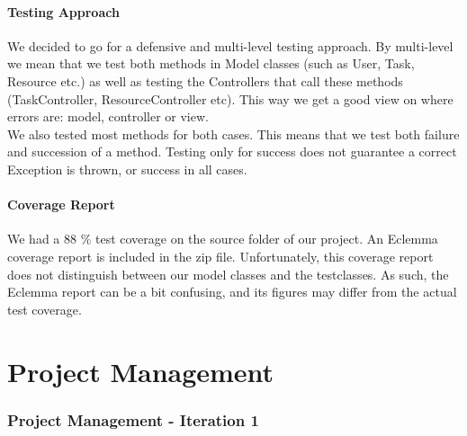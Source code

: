 		\subsection{Testing Approach}
		We decided to go for a defensive and multi-level testing approach.
		By multi-level we mean that we test both methods in Model classes (such as User, Task, Resource etc.) as well as testing the Controllers that call these methods (TaskController, ResourceController etc). 
		This way we get a good view on where errors are: model, controller or view.\\
		We also tested most methods for both cases. This means that we test both failure and succession of a method. Testing only for success does not guarantee a correct Exception is thrown, or success in all cases.
		\subsection{Coverage Report}
		We had a 88 \% test coverage on the source folder of our project. An Eclemma coverage report is included in the zip file. Unfortunately, this coverage report does not distinguish between our model classes and the testclasses. As such, the Eclemma report can be a bit confusing, and its figures may differ from the actual test coverage.
	
	\part{Project Management}
	
	\section{Project Management - Iteration 1}
